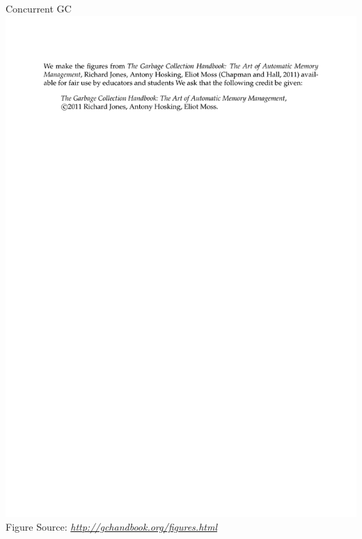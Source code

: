 \documentclass[
14pt,
aspectratio=169,
usenames,
dvipsnames,
x11names]{beamer}
\newcommand{\src}[1]{\scriptsize Figure Source: \textit{#1}}
\begin{document}
\begin{frame}{Concurrent GC}
  \centering
  \includegraphics[page=75,trim=2cm 3cm 2cm 13.5cm,clip,height=.7\textheight]{gchandbookfigures}\\
  \src{\url{http://gchandbook.org/figures.html}}
\end{frame}
\end{document}
